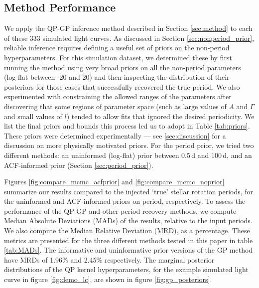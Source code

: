 \documentclass[useAMS, usenatbib, preprint, 12pt]{aastex}
\newcommand{\percentgpMADnp}{2.45}
\newcommand{\percentgpMAD}{1.96}
\newcommand{\vrcomment}[1]{{\color{magenta}#1}}
\begin{document}
\subsection{Method Performance}
\label{sec:performance}

We apply the QP-GP inference method described in Section \ref{sec:method}
to each of these 333 simulated light curves.  As discussed in Section
\ref{sec:nonperiod_prior}, reliable inference
requires defining a useful set of priors on the non-period
hyperparameters.
For this simulation dataset, we determined these by first running
the method using very broad priors on all the non-period parameters
(log-flat between -20 and 20)
and then inspecting the distribution of their posteriors for those cases
that successfully recovered the true period.
We also experimented with constraining the allowed ranges of the parameters
after discovering that some regions of parameter space (such as large values
of $A$ and $\Gamma$ and small values of $l$) tended to allow fits that ignored
the desired periodicity.
We list the final priors and bounds this process led us to adopt
in Table \ref{tab:priors}.
These priors were determined experimentally --- see \textsection
\ref{sec:discussion} for a discussion on more physically motivated priors.
For the period prior, we tried two different methods: an uninformed (log-flat)
prior between 0.5\,d and 100\,d, and an ACF-informed prior
(Section \ref{sec:period_prior}).

Figures \ref{fig:compare_mcmc_acfprior} and \ref{fig:compare_mcmc_noprior}
summarize our results compared to the injected
`true' stellar rotation periods, for the uninformed and ACF-informed priors on
period, respectively.
To assess the performance of the QP-GP and other period recovery
methods, we compute Median Absolute Deviations (MADs) of the results, relative
to the input periods.
We also compute the Median Relative Deviation (MRD), as a percentage.
These metrics are presented for the three different methods tested in this
paper in table \ref{tab:MADs}.
The informative and uninformative prior versions of the GP method have MRDs of
\percentgpMAD \% and \percentgpMADnp \% respectively.
The marginal posterior distributions of the QP kernel hyperparameters, for the
example simulated light curve in figure \ref{fig:demo_lc}, are shown in
figure \ref{fig:gp_posteriors}.
\end{document}
